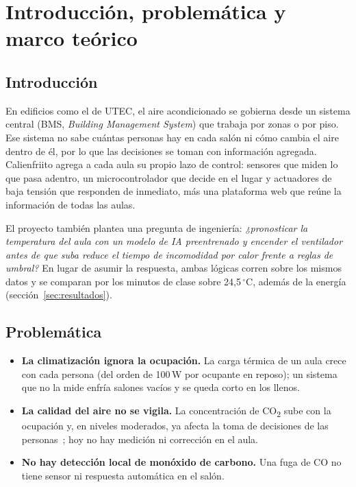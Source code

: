\documentclass[10pt,a4paper]{article}
\newcommand{\COd}{CO\textsubscript{2}}
\begin{document}
\section{Introducción, problemática y marco teórico}
\subsection{Introducción}
En edificios como el de UTEC, el aire acondicionado se gobierna desde un sistema central (BMS, \emph{Building Management System}) que trabaja por zonas o por piso. Ese sistema no sabe cuántas personas hay en cada salón ni cómo cambia el aire dentro de él, por lo que las decisiones se toman con información agregada. Calienfriito agrega a cada aula su propio lazo de control: sensores que miden lo que pasa adentro, un microcontrolador que decide en el lugar y actuadores de baja tensión que responden de inmediato, más una plataforma web que reúne la información de todas las aulas.

El proyecto también plantea una pregunta de ingeniería: \emph{¿pronosticar la temperatura del aula con un modelo de IA preentrenado y encender el ventilador antes de que suba reduce el tiempo de incomodidad por calor frente a reglas de umbral?} En lugar de asumir la respuesta, ambas lógicas corren sobre los mismos datos y se comparan por los minutos de clase sobre 24,5\,$^\circ$C, además de la energía (sección~\ref{sec:resultados}).

\subsection{Problemática}
\begin{itemize}[leftmargin=12pt]
  \item \textbf{La climatización ignora la ocupación.} La carga térmica de un aula crece con cada persona (del orden de 100\,W por ocupante en reposo); un sistema que no la mide enfría salones vacíos y se queda corto en los llenos.
  \item \textbf{La calidad del aire no se vigila.} La concentración de \COd{} sube con la ocupación y, en niveles moderados, ya afecta la toma de decisiones de las personas~\cite{satish}; hoy no hay medición ni corrección en el aula.
  \item \textbf{No hay detección local de monóxido de carbono.} Una fuga de CO no tiene sensor ni respuesta automática en el salón.
\end{itemize}
\end{document}
